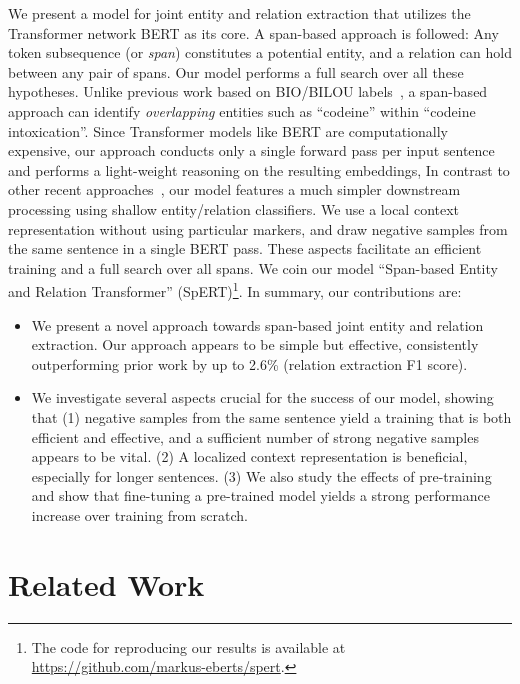 \documentclass{ecai}
\begin{document}
We present a model for joint entity and relation extraction that utilizes the Transformer network BERT as its core. A span-based approach is followed: Any token subsequence (or {\it span}) constitutes a potential entity, and a relation can hold between any pair of spans. Our model performs a full search over all these hypotheses. Unlike previous work based on BIO/BILOU labels~\cite{bekoulis:2018:multi_head,li:2019:joint_bert,nguyen:2019:biaffine_attention}, a span-based approach can identify {\it overlapping} entities such as ``codeine'' within ``codeine intoxication''.
Since Transformer models like BERT are computationally expensive, our approach conducts only a single forward pass per input sentence and performs a light-weight reasoning on the resulting embeddings, In contrast to other recent approaches~\cite{luan:2019:span_graphs,wadden:2019:dygie++}, our model features a much simpler downstream processing using shallow entity/relation classifiers.
We use a local context representation without using particular markers, and draw negative samples from the same sentence in a single BERT pass. These aspects facilitate an efficient training and a full search over all spans.
We coin our model ``Span-based Entity and Relation Transformer'' (SpERT)\footnote{The code for
reproducing our results is available at \\ \href{https://github.com/markus-eberts/spert}{https://github.com/markus-eberts/spert}.}. 
In summary, our contributions are:
\begin{itemize}
\item We present a novel approach towards span-based joint entity and relation extraction. 
    Our approach appears to be simple but effective, consistently outperforming prior work by up to 2.6\% (relation extraction F1 score). 
    \item We investigate several aspects crucial for the success of our model, showing that (1) negative samples from the same sentence yield a training that is both efficient and effective, and a sufficient number of strong negative samples appears to be vital. (2) A localized context representation is beneficial, especially for longer sentences. (3) We also study the effects of pre-training and show that fine-tuning a pre-trained model yields a strong performance increase over training from scratch. \end{itemize}

\section{Related Work}
\end{document}

